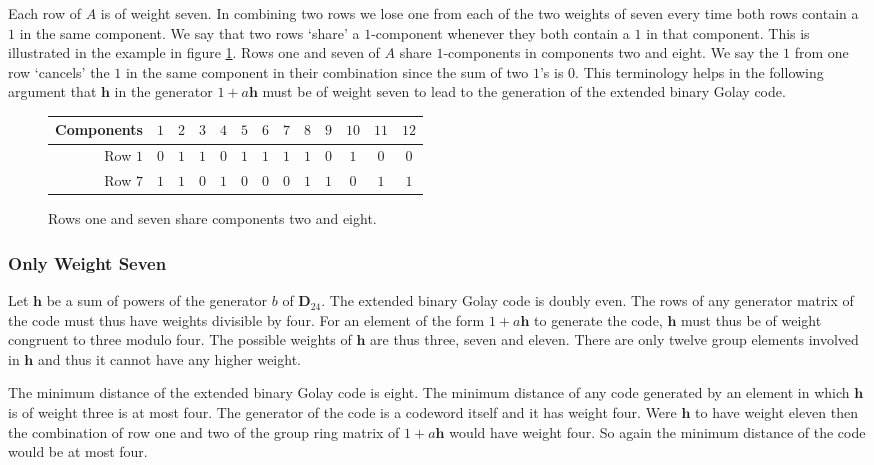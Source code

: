 Each row of $A$ is of weight seven.
In combining two rows we lose one from each of the two weights of seven every time both rows contain a $1$ in the same component.
We say that two rows `share' a $1$-component whenever they both contain a $1$ in that component.
This is illustrated in the example in figure \ref{fig:sharedcomponents}.
Rows one and seven of $A$ share $1$-components in components two and eight.
We say the $1$ from one row `cancels' the $1$ in the same component in their combination since the sum of two $1$'s is $0$.
This terminology helps in the following argument that $\mathbf{h}$ in the generator $1+ a \mathbf{h}$ must be of weight seven to lead to the generation of the extended binary Golay code.
\begin{figure}
\begin{center}
\begin{tabular}{|r|cccccccccccc|}
	\hline
	Components & $1$ & $ 2$ & $ 3$ & $ 4$ & $ 5$ & $ 6$ & $ 7$ & $ 8$ & $ 9$ & $10$ & $11$ & $12$ \\
	\hline
	Row $1$ & $0$ & $1$ & $1$ & $0$ & $1$ & $1$ & $1$ & $1$ & $0$ & $1$ & $0$ & $0$ \\
	Row $7$ & $1$ & $1$ & $0$ & $1$ & $0$ & $0$ & $0$ & $1$ & $1$ & $0$ & $1$ & $1$ \\
	\hline
\end{tabular}
\caption{Rows one and seven share components two and eight.}
\label{fig:sharedcomponents}
\end{center}
\end{figure}

\subsubsection{Only Weight Seven}
\label{sect:onlywtseven}
Let $\mathbf{h}$ be a sum of powers of the generator $b$ of $\mathbf{D}_{24}$.
The extended binary Golay code is doubly even.
The rows of any generator matrix of the code must thus have weights divisible by four.
For an element of the form $1+ a \mathbf{h}$ to generate the code, $\mathbf{h}$ must thus be of weight congruent to three modulo four.
The possible weights of $\mathbf{h}$ are thus three, seven and eleven.
There are only twelve group elements involved in $\mathbf{h}$ and thus it cannot have any higher weight.

The minimum distance of the extended binary Golay code is eight.
The minimum distance of any code generated by an element in which $\mathbf{h}$ is of weight three is at most four.
The generator of the code is a codeword itself and it has weight four.
Were $\mathbf{h}$ to have weight eleven then the combination of row one and two of the group ring matrix of $1+ a \mathbf{h}$ would have weight four.
So again the minimum distance of the code would be at most four.

